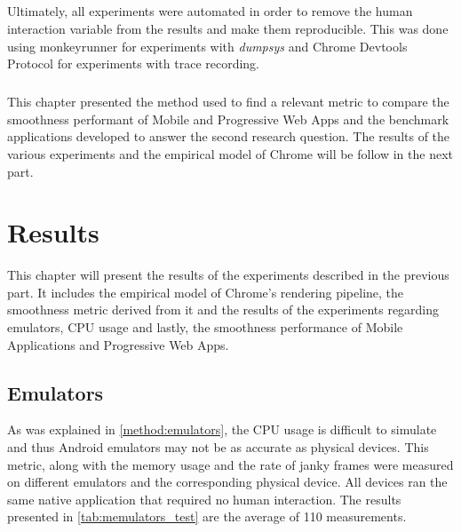 \documentclass{kththesis}
\begin{document}
\paragraph{}
Ultimately, all experiments were automated in order to remove the human interaction variable from the results and make them reproducible. This was done using monkeyrunner for experiments with \textit{dumpsys} and Chrome Devtools Protocol for experiments with trace recording.

\paragraph{}
This chapter presented the method used to find a relevant metric to compare the smoothness performant of Mobile and Progressive Web Apps and the benchmark applications developed to answer the second research question. The results of the various experiments and the empirical model of Chrome will be follow in the next part.

\chapter{Results}

This chapter will present the results of the experiments described in the previous part. It includes the empirical model of Chrome's rendering pipeline, the smoothness metric derived from it and the results of the experiments regarding emulators, CPU usage and lastly, the smoothness performance of Mobile Applications and Progressive Web Apps.

\section{Emulators}

As was explained in \autoref{method:emulators}, the CPU usage is difficult to simulate and thus Android emulators may not be as accurate as physical devices. This metric, along with the memory usage and the rate of janky frames were measured on different emulators and the corresponding physical device. All devices ran the same native application that required no human interaction. The results presented in \autoref{tab:memulators_test} are the average of 110 measurements.
\end{document}
